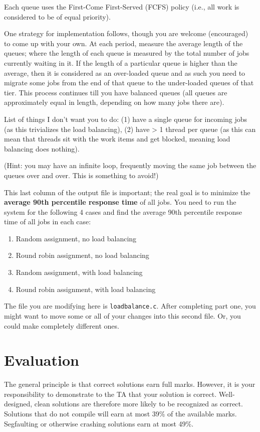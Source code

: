 \documentclass[letterpaper,10pt]{article}
\begin{document}
Each queue uses the First-Come First-Served (FCFS) policy (i.e., all work is considered to be of equal priority).

One strategy for implementation follows, though you are welcome (encouraged) to come up with your own. At each period, measure the average length of the queues; where the length of each queue is measured by the total number of jobs currently waiting in it. If the length of a particular queue is higher than the average, then it is considered as an over-loaded queue and as such you need to migrate some jobs from the end of that queue to the under-loaded queues of that tier. This process continues till you have balanced queues (all queues are approximately equal in length, depending on how many jobs there are).

List of things I don't want you to do: (1) have a single queue for incoming jobs (as this trivializes the load balancing), (2) have > 1 thread per queue (as this can mean that threads sit with the work items and get blocked, meaning load balancing does nothing).

(Hint: you may have an infinite loop, frequently moving the same job between the queues over and over. This is something to avoid!)

This last column of the output file is important; the real goal is to minimize the \textbf{average 90th percentile response time} of all jobs. You need to run the system for the following 4 cases and find the average 90th percentile response time of all jobs in each case:

\begin{enumerate}
	\item Random assignment, no load balancing
	\item Round robin assignment, no load balancing
	\item Random assignment, with load balancing
	\item Round robin assignment, with load balancing
\end{enumerate}

The file you are modifying here is \texttt{loadbalance.c}. After completing part one, you might want to move some or all of your changes into this second file. Or, you could make completely different ones.

\section*{Evaluation}

The general principle is that correct solutions earn full marks.
However, it is your responsibility to demonstrate to the TA
that your solution is correct. Well-designed, clean solutions 
are therefore more likely to be recognized as correct. Solutions that do not compile will earn at most 39\% of the available
marks. Segfaulting or otherwise crashing solutions earn
at most 49\%.
\end{document}
